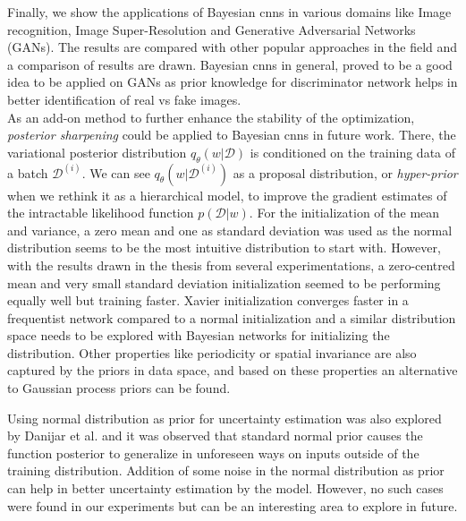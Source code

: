 \newline Finally, we show the applications of Bayesian \acp{cnn} in various domains like Image recognition, Image Super-Resolution and Generative Adversarial Networks (GANs). The results are compared with other popular approaches in the field and a comparison of results are drawn. Bayesian \acp{cnn} in general, proved to be a good idea to be applied on GANs as prior knowledge for discriminator network helps in better identification of real vs fake images. \\


As an add-on method to further enhance the stability of the optimization, \textit{posterior sharpening} \cite{fortunato2017bayesian} could be applied to Bayesian \acp{cnn} in future work. There, the variational posterior distribution $q_{\theta}(w|\mathcal{D})$ is conditioned on the training data of a batch $\mathcal{D}^{(i)}$. We can see $q_{\theta}(w|\mathcal{D}^{(i)})$ as a proposal distribution, or \textit{hyper-prior} when we rethink it as a hierarchical model, to improve the gradient estimates of the intractable likelihood function $p(\mathcal{D}|w)$. For the initialization of the mean and variance, a zero mean and one as standard deviation was used as the normal distribution seems to be the most intuitive distribution to start with. However, with the results drawn in the thesis from several experimentations, a zero-centred mean and very small standard deviation initialization seemed to be performing equally well but training faster. Xavier initialization \cite{glorot2010understanding} converges faster in a frequentist network compared to a normal initialization and a similar distribution space needs to be explored with Bayesian networks for initializing the distribution. Other properties like periodicity or spatial invariance are also captured by the priors in data space, and based on these properties an alternative to Gaussian process priors can be found. 

\newline Using normal distribution as prior for uncertainty estimation was also explored by Danijar et al. \cite{hafner2018reliable} and it was observed that standard normal prior causes the function posterior to generalize in unforeseen ways on inputs outside of the training distribution. Addition of some noise in the normal distribution as prior can help in better uncertainty estimation by the model. However, no such cases were found in our experiments but can be an interesting area to explore in future. 


